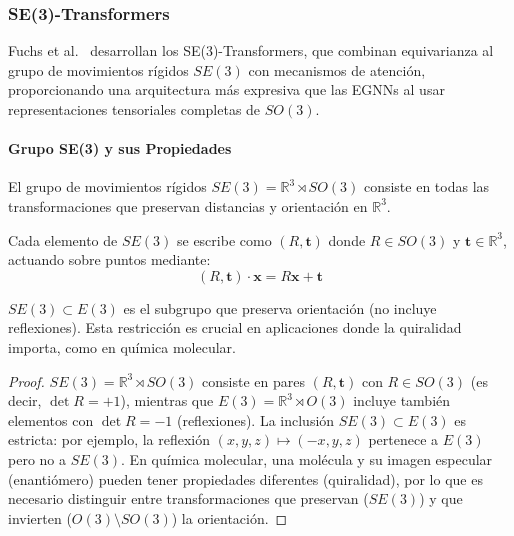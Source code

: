\subsubsection{SE(3)-Transformers}

Fuchs et al.~\citep{fuchs2020se3transformers} desarrollan los SE(3)-Transformers, que combinan equivarianza al grupo de movimientos rígidos $SE(3)$ con mecanismos de atención, proporcionando una arquitectura más expresiva que las EGNNs al usar representaciones tensoriales completas de $SO(3)$.

\paragraph{Grupo SE(3) y sus Propiedades}

\begin{definition}[Grupo SE(3)]
El grupo de movimientos rígidos $SE(3) = \mathbb{R}^3 \rtimes SO(3)$ consiste en todas las transformaciones que preservan distancias y orientación en $\mathbb{R}^3$.
\end{definition}

Cada elemento de $SE(3)$ se escribe como $(R, \mathbf{t})$ donde $R \in SO(3)$ y $\mathbf{t} \in \mathbb{R}^3$, actuando sobre puntos mediante:
\begin{equation}
(R, \mathbf{t}) \cdot \mathbf{x} = R\mathbf{x} + \mathbf{t}
\end{equation}

\begin{proposition}
$SE(3) \subset E(3)$ es el subgrupo que preserva orientación (no incluye reflexiones). Esta restricción es crucial en aplicaciones donde la quiralidad importa, como en química molecular.
\end{proposition}

\begin{proof}
$SE(3) = \mathbb{R}^3 \rtimes SO(3)$ consiste en pares $(R, \mathbf{t})$ con $R \in SO(3)$ (es decir, $\det R = +1$), mientras que $E(3) = \mathbb{R}^3 \rtimes O(3)$ incluye también elementos con $\det R = -1$ (reflexiones). La inclusión $SE(3) \subset E(3)$ es estricta: por ejemplo, la reflexión $(x,y,z) \mapsto (-x,y,z)$ pertenece a $E(3)$ pero no a $SE(3)$. En química molecular, una molécula y su imagen especular (enantiómero) pueden tener propiedades diferentes (quiralidad), por lo que es necesario distinguir entre transformaciones que preservan ($SE(3)$) y que invierten ($O(3) \setminus SO(3)$) la orientación.
\end{proof}

